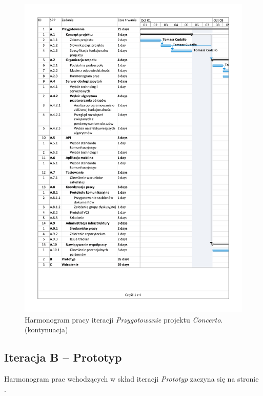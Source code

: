\documentclass[10pt]{dokument-ppi}
\begin{document}
\begin{figure}[p]
    \ContinuedFloat
    \includegraphics[trim=1.2cm 1.2cm 1.2cm 1.2cm,page=4,width=\textwidth]{./figury/harmonogram-pracy-A-przygotowanie}
    \caption[]{Harmonogram pracy iteracji \emph{Przygotowanie} projektu \emph{Concerto}. (kontynuacja)}
\end{figure}

\subsection{Iteracja B -- Prototyp}

Harmonogram prac wchodzących w skład iteracji \emph{Prototyp}
zaczyna się na stronie \pageref{fig:iteracja-prototyp}.
\end{document}
